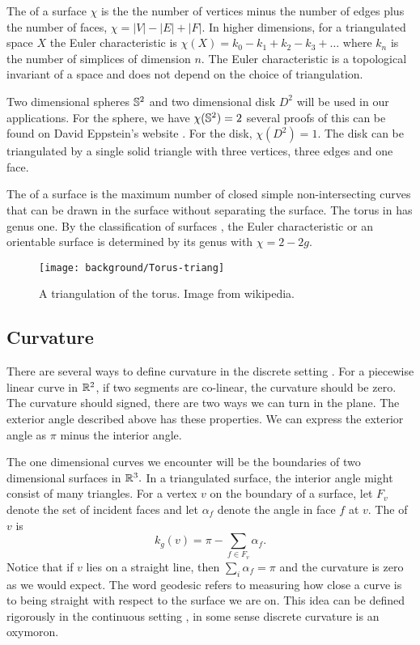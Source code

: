 The  of a surface $\chi$ is the 
the number of vertices minus the number of edges plus  the number of faces, $\chi=|V|-|E|+|F|.$
In higher dimensions, for a triangulated space $X$ the Euler characteristic is 
$\chi(X)=k_0-k_1+k_2-k_3+\ldots$ where $k_n$ is the number of simplices of dimension $n.$
The Euler characteristic is a topological invariant of a space
and does not depend on the choice of triangulation.


Two dimensional spheres $\mathbb{S}^2$ and two dimensional disk $D^2$ 
will be used in our applications.
For the sphere, we have $\chi(\mathbb{S}^2)=2$ 
several proofs of this can be found on David Eppstein's website \cite{eppstein-proofs}.
For the disk, $\chi(D^2)=1$. The disk can be triangulated by
a single solid triangle with three vertices, three edges and one face.



The  of a surface is the maximum number of closed simple
non-intersecting curves that can be drawn in the surface without separating
the surface.
The torus in  has genus one.
By the classification of surfaces \cite{munkres}, the Euler characteristic or an orientable surface
is determined by its genus with $\chi=2-2g$.



\begin{figure}[htb]
\centering
\texttt{[image: background/Torus-triang]}
\caption{A triangulation of the torus. Image from wikipedia.}
\label{fig:triangulated-torus}
\end{figure}

\subsection{Curvature}


There are several ways to define curvature in the discrete setting \cite{Crane:2013}.
For a piecewise linear curve in $\mathbb{R}^2$, 
if two segments are co-linear, the curvature should be zero.
The curvature should signed, there are two ways we can turn in
the plane.
The exterior angle described above has these properties.
We can express the exterior angle as $\pi$ minus the interior angle.

The one dimensional curves we encounter will be the boundaries
of two dimensional surfaces in $\mathbb{R}^3.$
In a triangulated surface, the interior angle might consist of many triangles.
For a vertex $v$ on the boundary of a surface, 
let $F_v$  denote the set of incident faces and let
$\alpha_f$ denote the angle in face $f$ at $v$.
The 
of $v$  is
$$k_{g}(v)= \pi-\sum_{f\in F_v}\alpha_f.$$
Notice that if $v$ lies on a straight line, then $\sum_{i}\alpha_f=\pi$
and the curvature is zero as we would expect.
The word geodesic refers to measuring how close
a curve is to being straight with respect to the surface we are on.
This idea can be defined rigorously in the continuous setting \cite{doc76},
in some sense discrete curvature is an oxymoron. 



